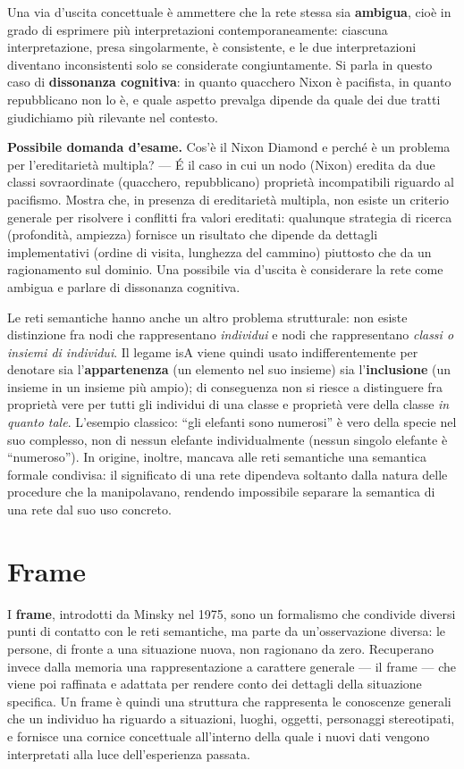 \documentclass[11pt,a4paper]{report}
\newcommand{\domandaesame}[1]{\begin{esame}\textbf{Possibile domanda d'esame.} #1\end{esame}}
\begin{document}
Una via d'uscita concettuale è ammettere che la rete stessa sia \textbf{ambigua}, cioè in grado di esprimere più interpretazioni contemporaneamente: ciascuna interpretazione, presa singolarmente, è consistente, e le due interpretazioni diventano inconsistenti solo se considerate congiuntamente. Si parla in questo caso di \textbf{dissonanza cognitiva}: in quanto quacchero Nixon è pacifista, in quanto repubblicano non lo è, e quale aspetto prevalga dipende da quale dei due tratti giudichiamo più rilevante nel contesto.

\domandaesame{Cos'è il Nixon Diamond e perché è un problema per l'ereditarietà multipla? --- \'E il caso in cui un nodo (Nixon) eredita da due classi sovraordinate (quacchero, repubblicano) proprietà incompatibili riguardo al pacifismo. Mostra che, in presenza di ereditarietà multipla, non esiste un criterio generale per risolvere i conflitti fra valori ereditati: qualunque strategia di ricerca (profondità, ampiezza) fornisce un risultato che dipende da dettagli implementativi (ordine di visita, lunghezza del cammino) piuttosto che da un ragionamento sul dominio. Una possibile via d'uscita è considerare la rete come ambigua e parlare di dissonanza cognitiva.}

Le reti semantiche hanno anche un altro problema strutturale: non esiste distinzione fra nodi che rappresentano \emph{individui} e nodi che rappresentano \emph{classi o insiemi di individui}. Il legame isA viene quindi usato indifferentemente per denotare sia l'\textbf{appartenenza} (un elemento nel suo insieme) sia l'\textbf{inclusione} (un insieme in un insieme più ampio); di conseguenza non si riesce a distinguere fra proprietà vere per tutti gli individui di una classe e proprietà vere della classe \emph{in quanto tale}. L'esempio classico: ``gli elefanti sono numerosi'' è vero della specie nel suo complesso, non di nessun elefante individualmente (nessun singolo elefante è ``numeroso''). In origine, inoltre, mancava alle reti semantiche una semantica formale condivisa: il significato di una rete dipendeva soltanto dalla natura delle procedure che la manipolavano, rendendo impossibile separare la semantica di una rete dal suo uso concreto.

\section{Frame}

I \textbf{frame}, introdotti da Minsky nel 1975, sono un formalismo che condivide diversi punti di contatto con le reti semantiche, ma parte da un'osservazione diversa: le persone, di fronte a una situazione nuova, non ragionano da zero. Recuperano invece dalla memoria una rappresentazione a carattere generale --- il frame --- che viene poi raffinata e adattata per rendere conto dei dettagli della situazione specifica. Un frame è quindi una struttura che rappresenta le conoscenze generali che un individuo ha riguardo a situazioni, luoghi, oggetti, personaggi stereotipati, e fornisce una cornice concettuale all'interno della quale i nuovi dati vengono interpretati alla luce dell'esperienza passata.
\end{document}
